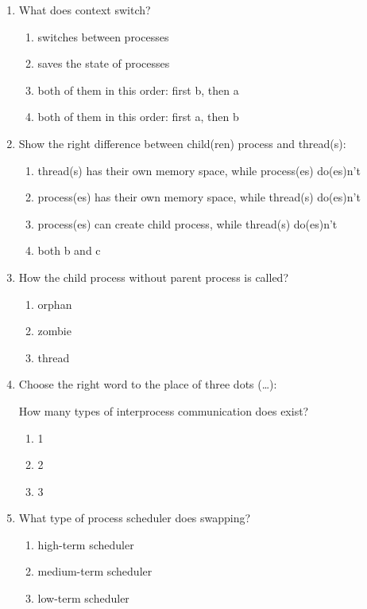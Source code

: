 \documentclass[paper=8.5in:11in]{scrartcl}
\begin{document}
\begin{enumerate}
\begin{enumerate}[label=\alph*)]
\end{enumerate}

\item What does context switch?

\begin{enumerate}[label=\alph*)]
\item switches between processes
\item saves the state of processes
\item both of them in this order: first b, then a
\item both of them in this order: first a, then b
\end{enumerate}

\item Show the right difference between child(ren) process and thread(s):

\begin{enumerate}[label=\alph*)]
\item thread(s) has their own memory space, while process(es) do(es)n’t
\item process(es) has their own memory space, while thread(s) do(es)n’t
\item process(es) can create child process, while thread(s) do(es)n’t
\item both b and c
\end{enumerate}

\item How the child process without parent process is called?

\begin{enumerate}[label=\alph*)]
\item orphan
\item zombie
\item thread
\end{enumerate}

\item Choose the right word to the place of three dots (\ldots):

How many types of interprocess communication does exist?

\begin{enumerate}[label=\alph*)]
\item 1
\item 2
\item 3
\end{enumerate}

\item What type of process scheduler does swapping?
\begin{enumerate}[label=\alph*)]
\item high-term scheduler
\item medium-term scheduler
\item low-term scheduler
\end{enumerate}


\end{enumerate}
\end{document}
